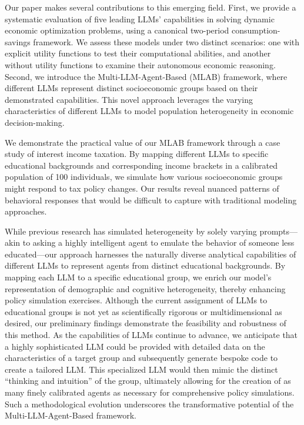 \documentclass[12pt]{article}
\begin{document}
\begin{CJK*}{UTF8}{gbsn}
Our paper makes several contributions to this emerging field. First, we provide a systematic evaluation of five leading LLMs' capabilities in solving dynamic economic optimization problems, using a canonical two-period consumption-savings framework. We assess these models under two distinct scenarios: one with explicit utility functions to test their computational abilities, and another without utility functions to examine their autonomous economic reasoning. Second, we introduce the Multi-LLM-Agent-Based (MLAB) framework, where different LLMs represent distinct socioeconomic groups based on their demonstrated capabilities. This novel approach leverages the varying characteristics of different LLMs to model population heterogeneity in economic decision-making.

We demonstrate the practical value of our MLAB framework through a case study of interest income taxation. By mapping different LLMs to specific educational backgrounds and corresponding income brackets in a calibrated population of 100 individuals, we simulate how various socioeconomic groups might respond to tax policy changes. Our results reveal nuanced patterns of behavioral responses that would be difficult to capture with traditional modeling approaches.

While previous research has simulated heterogeneity by solely varying prompts—akin to asking a highly intelligent agent to emulate the behavior of someone less educated—our approach harnesses the naturally diverse analytical capabilities of different LLMs to represent agents from distinct educational backgrounds. By mapping each LLM to a specific educational group, we enrich our model's representation of demographic and cognitive heterogeneity, thereby enhancing policy simulation exercises. Although the current assignment of LLMs to educational groups is not yet as scientifically rigorous or multidimensional as desired, our preliminary findings demonstrate the feasibility and robustness of this method. As the capabilities of LLMs continue to advance, we anticipate that a highly sophisticated LLM could be provided with detailed data on the characteristics of a target group and subsequently generate bespoke code to create a tailored LLM. This specialized LLM would then mimic the distinct “thinking and intuition” of the group, ultimately allowing for the creation of as many finely calibrated agents as necessary for comprehensive policy simulations. Such a methodological evolution underscores the transformative potential of the Multi-LLM-Agent-Based framework.


\end{CJK*}
\end{document}
